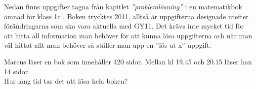 \textcolor{WildStrawberry}{
    Nedan finns uppgifter tagna från  kapitlet \textit{''problemlösning''} i en matematikbok ämnad för klass 1c \cite{matte5000}. Boken trycktes 2011, alltså är uppgifterna designade utefter förändringarna som ska vara aktuella med GY11. Det krävs inte mycket tid för att hitta all information man behöver för att kunna lösa uppgifterna och när man väl hittat allt man behöver så ställer man upp en ''lös ut x'' uppgift.}





\begin{displayquote}
\textcolor{turkos}{Marcus läser en bok som innehåller 420 sidor. Mellan kl 19.45 och 20.15 läser han 14 sidor. \\
Hur lång tid tar det att läsa hela boken?}
\end{displayquote}


